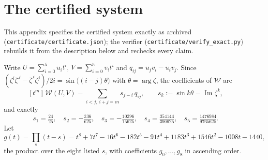 \documentclass[10pt]{amsart}
\begin{document}
\appendix

\section{The certified system}\label{app:system}

This appendix specifies the certified system exactly as archived
(\texttt{certificate/certificate.json}); the verifier
(\texttt{certificate/verify\_exact.py}) rebuilds it from the
description below and rechecks every claim.

Write $U=\sum_{i=0}^{5}u_it^i$, $V=\sum_{i=0}^{5}v_it^i$ and
$q_{ij}=u_jv_i-u_iv_j$. Since
$(\zeta^i\bar\zeta^{\,j}-\bar\zeta^{\,i}\zeta^j)/2i
=\sin\bigl((i-j)\theta\bigr)$ with $\theta=\arg\zeta$, the
coefficients of $\mathcal W$ are
\[
[t^m]\,\mathcal W(U,V)=\sum_{i<j,\ i+j=m}s_{j-i}\,q_{ij},
\qquad
s_k:=\sin k\theta=\operatorname{Im}\zeta^k,
\]
and exactly
\[
s_1=\tfrac{24}{25},\quad
s_2=-\tfrac{336}{625},\quad
s_3=-\tfrac{10296}{15625},\quad
s_4=\tfrac{354144}{390625},\quad
s_5=\tfrac{1476984}{9765625}.
\]
Let
\[
g(t)=\prod_{s}(t-s)
=t^8+7t^7-16t^6-182t^5-91t^4+1183t^3+1546t^2-1008t-1440,
\]
the product over the eight listed $s$, with coefficients
$g_0,\dots,g_8$ in ascending order.
\end{document}

